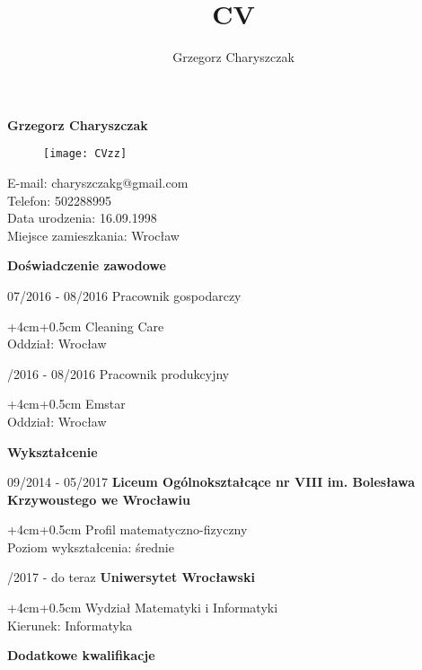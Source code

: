 \documentclass[10	pt]{article}
\title{CV}
\author{Grzegorz Charyszczak}
\begin{document}
\begin{flushleft}
{\textbf{\fontsize{18}{18}\selectfont Grzegorz Charyszczak}}\\
\end{flushleft}
\begin{figure}
\hfill
\texttt{[image: CVzz]}
\vspace{-5cm}
\end{figure}
\hfill\break
E-mail: charyszczakg@gmail.com\\
Telefon: 502288995\\
Data urodzenia: 16.09.1998\\
Miejsce zamieszkania: Wrocław\\
\hfill\break
\begin{flushleft}
{\textbf{\fontsize{12}{12}\selectfont Doświadczenie zawodowe}}\\
\hrulefill
\end{flushleft}
07/2016 - 08/2016 \quad \qquad Pracownik gospodarczy
\begin{adjustwidth*}{+4cm}{+0.5cm}
Cleaning Care\\
Oddział: Wrocław\\
\end{adjustwidth*}
\hfill{}/2016 - 08/2016 \quad \qquad Pracownik produkcyjny
\begin{adjustwidth*}{+4cm}{+0.5cm}
Emstar\\
Oddział: Wrocław\\
\end{adjustwidth*}
\begin{flushleft}
{\textbf{\fontsize{12}{12}\selectfont Wykształcenie}}\\
\hrulefill
\end{flushleft}
09/2014 - 05/2017 \quad \qquad \textbf{Liceum Ogólnokształcące nr VIII im. Bolesława Krzywoustego we Wrocławiu}
\begin{adjustwidth*}{+4cm}{+0.5cm}
Profil matematyczno-fizyczny\\
Poziom wykształcenia: średnie\\
\end{adjustwidth*}
\hfill{}/2017 - do teraz \quad \qquad \textbf{Uniwersytet Wrocławski}
\begin{adjustwidth*}{+4cm}{+0.5cm}
Wydział Matematyki i Informatyki\\
Kierunek: Informatyka\\
\end{adjustwidth*}
\begin{flushleft}
{\textbf{\fontsize{12}{12}\selectfont Dodatkowe kwalifikacje}}\\
\hrulefill
\end{flushleft}
\end{document}
